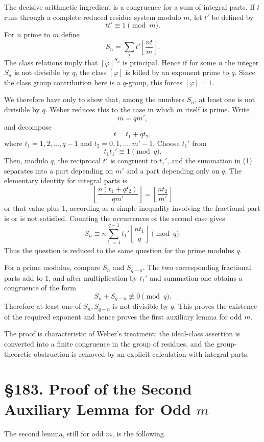 \documentclass[11pt,a4paper]{book}
\newcommand{\webersection}[2]{\clearpage\section*{\S #1. #2}}
\begin{document}
The decisive arithmetic ingredient is a congruence for a sum of integral parts.  If \(t\) runs through a complete reduced residue system modulo \(m\), let \(t'\) be defined by
\[
  tt'\equiv1\pmod m.
\]
For \(n\) prime to \(m\) define
\[
  S_n=\sum_t t'\left\lfloor\frac{nt}{m}\right\rfloor.
\tag{1}
\]
The class relations imply that \([\varphi]^ {S_n}\) is principal.  Hence if for some \(n\) the integer \(S_n\) is not divisible by \(q\), the class \([\varphi]\) is killed by an exponent prime to \(q\).  Since the class group contribution here is a \(q\)-group, this forces \([\varphi]
=1\).

We therefore have only to show that, among the numbers \(S_n\), at least one is not divisible by \(q\).  Weber reduces this to the case in which \(m\) itself is prime.  Write
\[
  m=qm',
\]
and decompose
\[
  t=t_1+qt_2,
\]
where \(t_1=1,
2,\ldots,q-1\) and \(t_2=0,1,\ldots,m'-1\).  Choose \(t_1'\) from
\[
  t_1t_1'\equiv1\pmod q.
\]
Then, modulo \(q\), the reciprocal \(t'\) is congruent to \(t_1'\), and the summation in (1) separates into a part depending on \(m'\) and a part depending only on \(q\).  The elementary identity for integral parts is
\[
  \left\lfloor\frac{n(t_1+qt_2)}{qm'}\right\rfloor
  =\left\lfloor\frac{nt_2}{m'}\right\rfloor
\tag{2}
\]
or that value plus \(1\), according as a simple inequality involving the fractional part is or is not satisfied.  Counting the occurrences of the second case gives
\[
  S_n\equiv n\sum_{t_1=1}^{q-1} t_1'\left\lfloor\frac{nt_1}{q}\right\rfloor\pmod q.
\tag{3}
\]
Thus the question is reduced to the same question for the prime modulus \(q\).

For a prime modulus, compare \(S_n\) and \(S_{q-n}\).  The two corresponding fractional parts add to \(1\), and after multiplication by \(t_1'
\) and summation one obtains a congruence of the form
\[
  S_n+S_{q-n}\not\equiv0\pmod q.
\tag{4}
\]
Therefore at least one of \(S_n,S_{q-n}\) is not divisible by \(q\).  This proves the existence of the required exponent and hence proves the first auxiliary lemma for odd \(m\).

The proof is characteristic of Weber's treatment: the ideal-class assertion is converted into a finite congruence in the group of residues, and the group-theoretic obstruction is removed by an explicit calculation with integral parts.

\webersection{183}{Proof of the Second Auxiliary Lemma for Odd \(m\)}

The second lemma, still for odd \(m\), is the following.
\end{document}
